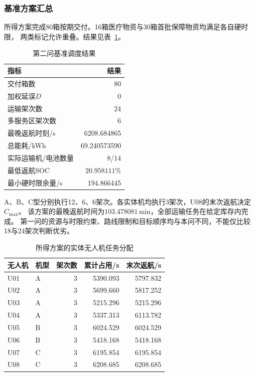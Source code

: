 \subsubsection{基准方案汇总}
所得方案完成80箱按期交付。16箱医疗物资与30箱首批保障物资均满足各自硬时限，
两类标记允许重叠。结果见表~\ref{tab:q2_summary}。
\begin{table}[htbp]
\centering
\small
\caption{第二问基准调度结果}
\label{tab:q2_summary}
\begin{tabular}{lr}
\toprule
指标 & 结果 \\
\midrule
交付箱数 & 80 \\
加权延误$D$ & 0 \\
运输架次数 & 24 \\
多服务区架次数 & 6 \\
最晚返航时刻/s & 6208.684865 \\
总能耗/kWh & 69.240573590 \\
实际运输机/电池数量 & 8/14 \\
最低返航SOC & $20.958111\%$ \\
最小硬时限余量/s & 194.866445 \\
\bottomrule
\end{tabular}
\end{table}
A、B、C型分别执行12、6、6架次。各实体机均执行3架次，U08的末次返航决定$C_{\max}$。
该方案的最晚返航时间为$103.478081\,\mathrm{min}$，全部运输任务在给定库存内完成。
第一问的资源与时限约束、路线限制和目标顺序均与本问不同，不能仅比较18与24架次判断优劣。
\begin{table}[htbp]
\centering
\small
\caption{所得方案的实体无人机任务分配}
\label{tab:q2_units}
\begin{tabular}{llrrr}
\toprule
无人机 & 机型 & 架次数 & 累计占用/s & 末次返航/s \\
\midrule
U01 & A & 3 & 5390.093 & 5797.832 \\
U02 & A & 3 & 5699.660 & 5817.252 \\
U03 & A & 3 & 5215.296 & 5215.296 \\
U04 & A & 3 & 5337.313 & 6113.782 \\
U05 & B & 3 & 6024.529 & 6024.529 \\
U06 & B & 3 & 5418.168 & 5418.168 \\
U07 & C & 3 & 6195.854 & 6195.854 \\
U08 & C & 3 & 6208.685 & 6208.685 \\
\bottomrule
\end{tabular}
\end{table}

